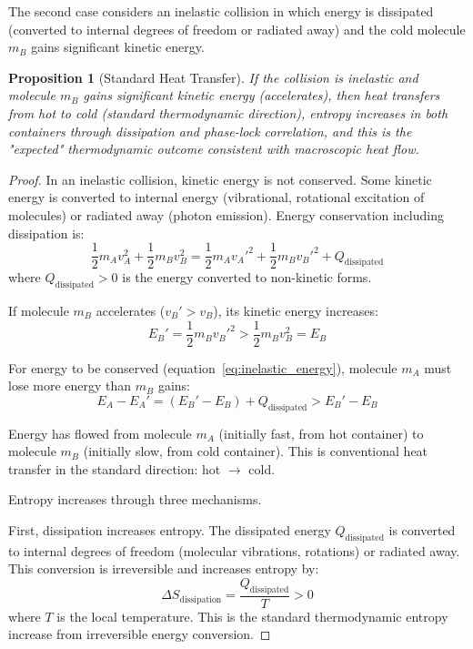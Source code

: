 \documentclass[12pt,a4paper]{article}
\newtheorem{proposition}[theorem]{Proposition}
\theoremstyle{definition}
\theoremstyle{remark}
\begin{document}
The second case considers an inelastic collision in which energy is dissipated (converted to internal degrees of freedom or radiated away) and the cold molecule $m_B$ gains significant kinetic energy.

\begin{proposition}[Standard Heat Transfer]
\label{prop:standard_heat}
If the collision is inelastic and molecule $m_B$ gains significant kinetic energy (accelerates), then heat transfers from hot to cold (standard thermodynamic direction), entropy increases in both containers through dissipation and phase-lock correlation, and this is the "expected" thermodynamic outcome consistent with macroscopic heat flow.
\end{proposition}

\begin{proof}
In an inelastic collision, kinetic energy is not conserved. Some kinetic energy is converted to internal energy (vibrational, rotational excitation of molecules) or radiated away (photon emission). Energy conservation including dissipation is:
\begin{equation}
\frac{1}{2}m_A v_A^2 + \frac{1}{2}m_B v_B^2 = \frac{1}{2}m_A v_A'^2 + \frac{1}{2}m_B v_B'^2 + Q_{\text{dissipated}}
\label{eq:inelastic_energy}
\end{equation}
where $Q_{\text{dissipated}} > 0$ is the energy converted to non-kinetic forms.

If molecule $m_B$ accelerates ($v_B' > v_B$), its kinetic energy increases:
\begin{equation}
E_B' = \frac{1}{2}m_B v_B'^2 > \frac{1}{2}m_B v_B^2 = E_B
\end{equation}

For energy to be conserved (equation~\eqref{eq:inelastic_energy}), molecule $m_A$ must lose more energy than $m_B$ gains:
\begin{equation}
E_A - E_A' = (E_B' - E_B) + Q_{\text{dissipated}} > E_B' - E_B
\end{equation}

Energy has flowed from molecule $m_A$ (initially fast, from hot container) to molecule $m_B$ (initially slow, from cold container). This is conventional heat transfer in the standard direction: hot $\to$ cold.

Entropy increases through three mechanisms.

First, dissipation increases entropy. The dissipated energy $Q_{\text{dissipated}}$ is converted to internal degrees of freedom (molecular vibrations, rotations) or radiated away. This conversion is irreversible and increases entropy by:
\begin{equation}
\Delta S_{\text{dissipation}} = \frac{Q_{\text{dissipated}}}{T} > 0
\label{eq:dissipation_entropy}
\end{equation}
where $T$ is the local temperature. This is the standard thermodynamic entropy increase from irreversible energy conversion.


\end{proof}
\end{document}
